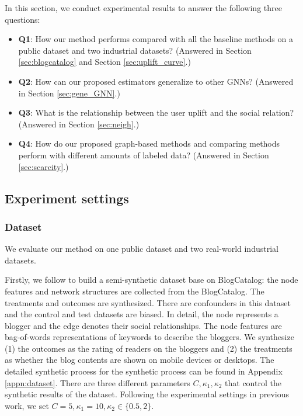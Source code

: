 In this section, we conduct experimental results to answer the following three questions:
\begin{itemize}
    \item \textbf{Q1}: How our method performs compared with all the baseline methods on a public dataset and two industrial datasets? (Answered in Section  \ref{sec:blogcatalog} and Section \ref{sec:uplift_curve}.)
    \item \textbf{Q2}: How can our proposed estimators generalize to other GNNs? (Answered in Section \ref{sec:gene_GNN}.)
    \item \textbf{Q3}: What is the relationship between the user uplift and the social relation? (Answered in Section \ref{sec:neigh}.)
    \item \textbf{Q4}: How do our proposed graph-based methods and comparing methods perform with different amounts of labeled data? (Answered in Section \ref{sec:scarcity}.)
\end{itemize}

\subsection{Experiment settings}
\subsubsection{Dataset} 
We evaluate our method on one public dataset and two real-world industrial datasets. 

Firstly, we follow \cite{guo2020learning} to  build a semi-synthetic dataset base on BlogCatalog: the node features and network structures are collected from the BlogCatalog. The treatments and outcomes are synthesized. There are confounders in this dataset and the control and test datasets are biased. In detail, the node represents a blogger and the edge denotes their social relationships. The node features are bag-of-words representations of keywords to describe the bloggers. We synthesize (1) the outcomes as the rating of readers on the bloggers and (2) the treatments as whether the blog contents are shown on mobile devices or desktops. The detailed synthetic process for the synthetic process can be found in Appendix \ref{appn:dataset}. There are three different parameters $C, \kappa_1, \kappa_2$ that control the synthetic results of the dataset. Following the experimental settings in previous work\cite{guo2020learning}, we set $C=5, \kappa_1=10, \kappa_2 \in\{0.5,2\}$.

